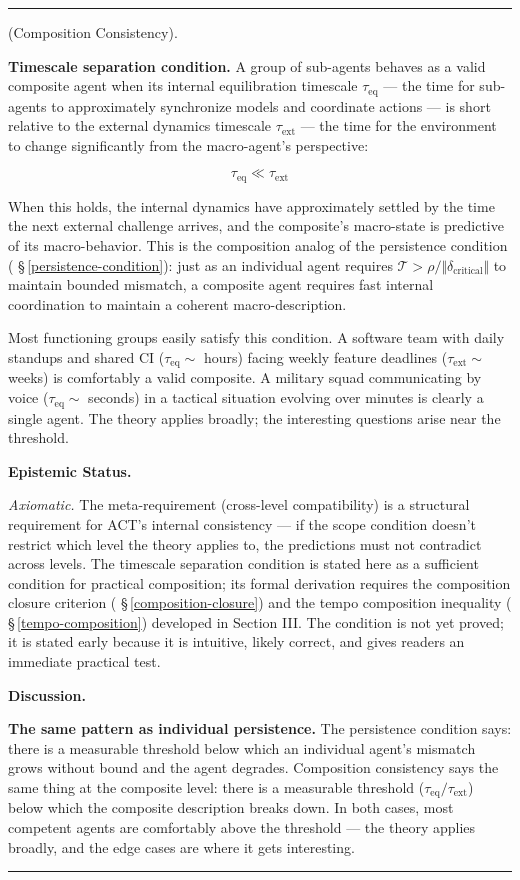 \documentclass[11pt,oneside]{article}
\newcounter{claim}[section]
\renewcommand{\theclaim}{\thesection.\arabic{claim}}
\newenvironment{segment}[2]{%
  \refstepcounter{claim}%
  \bigskip\noindent\hrule\smallskip
  \noindent{\bfseries #1~\theclaim}\enskip(#2).\par\smallskip
  \noindent\ignorespaces
}{%
  \par\smallskip\noindent\hrule\bigskip
}
\newenvironment{postulate}[1][]{\begin{segment}{Postulate}{#1}}{\end{segment}}
\begin{document}
\begin{postulate}[Composition Consistency]
\textbf{Timescale separation condition.} A group of sub-agents behaves as a valid composite agent when its internal equilibration timescale $\tau_{\text{eq}}$ — the time for sub-agents to approximately synchronize models and coordinate actions — is short relative to the external dynamics timescale $\tau_{\text{ext}}$ — the time for the environment to change significantly from the macro-agent's perspective:

$$\tau_{\text{eq}} \ll \tau_{\text{ext}}$$

When this holds, the internal dynamics have approximately settled by the time the next external challenge arrives, and the composite's macro-state is predictive of its macro-behavior. This is the composition analog of the persistence condition ( \S\,\ref{persistence-condition}): just as an individual agent requires $\mathcal{T} > \rho / \Vert\delta_{\text{critical}}\Vert$ to maintain bounded mismatch, a composite agent requires fast internal coordination to maintain a coherent macro-description.

Most functioning groups easily satisfy this condition. A software team with daily standups and shared CI ($\tau_{\text{eq}} \sim$ hours) facing weekly feature deadlines ($\tau_{\text{ext}} \sim$ weeks) is comfortably a valid composite. A military squad communicating by voice ($\tau_{\text{eq}} \sim$ seconds) in a tactical situation evolving over minutes is clearly a single agent. The theory applies broadly; the interesting questions arise near the threshold.


\medskip\noindent\textbf{Epistemic Status.}


\textit{Axiomatic.} The meta-requirement (cross-level compatibility) is a structural requirement for ACT's internal consistency — if the scope condition doesn't restrict which level the theory applies to, the predictions must not contradict across levels. The timescale separation condition is stated here as a sufficient condition for practical composition; its formal derivation requires the composition closure criterion ( \S\,\ref{composition-closure}) and the tempo composition inequality ( \S\,\ref{tempo-composition}) developed in Section III. The condition is not yet proved; it is stated early because it is intuitive, likely correct, and gives readers an immediate practical test.


\medskip\noindent\textbf{Discussion.}


\textbf{The same pattern as individual persistence.} The persistence condition says: there is a measurable threshold below which an individual agent's mismatch grows without bound and the agent degrades. Composition consistency says the same thing at the composite level: there is a measurable threshold ($\tau_{\text{eq}} / \tau_{\text{ext}}$) below which the composite description breaks down. In both cases, most competent agents are comfortably above the threshold — the theory applies broadly, and the edge cases are where it gets interesting.


\end{postulate}
\end{document}
